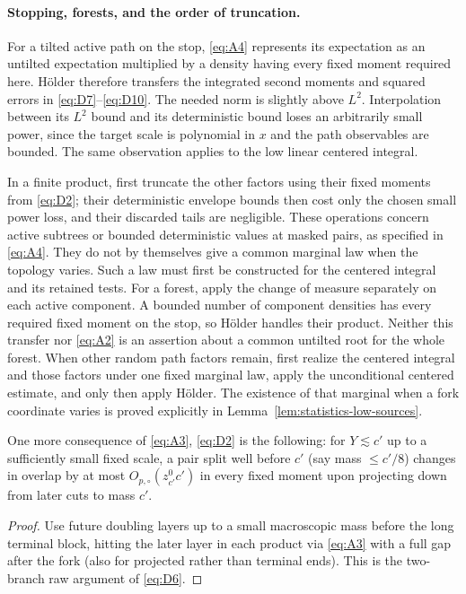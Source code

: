 \paragraph{Stopping, forests, and the order of truncation.}\label{par:statistics-tilt-transfer}
For a tilted active path on the stop, \eqref{eq:A4} represents
its expectation as an untilted expectation multiplied by a density
having every fixed moment required here.  H\"older therefore transfers
the integrated second moments and squared errors in
\eqref{eq:D7}--\eqref{eq:D10}.  The needed norm is slightly above
$L^2$.  Interpolation between its $L^2$ bound and its deterministic
bound loses an arbitrarily small power, since the target scale is
polynomial in $x$ and the path observables are bounded.
The same observation applies to the low linear centered integral.

In a finite product, first truncate the other factors using their
fixed moments from \eqref{eq:D2}; their deterministic envelope bounds
then cost only the chosen small power loss, and their discarded tails
are negligible.  These operations concern active subtrees or bounded
deterministic values at masked pairs, as specified in \eqref{eq:A4}.
They do not by themselves give a common marginal law when the topology
varies.  Such a law must first be constructed for the centered integral
and its retained tests.
For a forest, apply the change of measure separately on each active
component.  A bounded number of component densities has every required
fixed moment on the stop, so H\"older handles their product.  Neither
this transfer nor \eqref{eq:A2} is an assertion about a common untilted
root for the whole forest.  When other random path factors remain,
first realize the centered integral and those factors under one fixed
marginal law, apply the unconditional centered estimate, and only then
apply H\"older.  The existence of that marginal when a fork coordinate
varies is proved explicitly in Lemma~\ref{lem:statistics-low-sources}.

\begin{corollary}\label{cor:statistics-low-projection}
One more consequence of \eqref{eq:A3}, \eqref{eq:D2} is the following: for \(Y\lesssim c'\) up to a sufficiently small fixed scale, a pair split well before \(c'\) (say mass \(\le c'/8\)) changes in overlap by at most \(O_{p,\circ}(z_{c'}^0 c')\) in every fixed moment upon projecting down from later cuts to mass \(c'\). \end{corollary}
\begin{proof}
Use future doubling layers up to a small macroscopic mass before the long terminal block, hitting the later layer in each product via \eqref{eq:A3} with a full gap after the fork (also for projected rather than terminal ends). This is the two-branch raw argument of \eqref{eq:D6}.
\end{proof}

